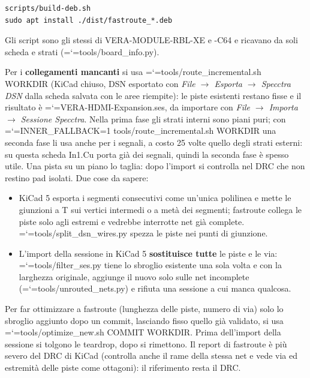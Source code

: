 \documentclass[11pt,a4paper]{article}
\makeatletter
\newcommand{\file}[1]{{\ttfamily\hyphenchar\font=`\-\relax\language=\l@nohyphenation #1}}
\makeatother
\begin{document}
\begin{lstlisting}[style=shell]
scripts/build-deb.sh
sudo apt install ./dist/fastroute_*.deb
\end{lstlisting}

Gli script sono gli stessi di VERA-MODULE-RBL-XE e -C64 e ricavano da soli
scheda e strati (\file{tools/board\_info.py}).

Per i \textbf{collegamenti mancanti} si usa
\file{tools/route\_incremental.sh WORKDIR} (KiCad chiuso, DSN esportato con
\emph{File $\rightarrow$ Esporta $\rightarrow$ Specctra DSN} dalla scheda
salvata con le aree riempite): le piste esistenti restano fisse e il risultato
è \file{VERA-HDMI-Expansion.ses}, da importare con \emph{File $\rightarrow$
Importa $\rightarrow$ Sessione Specctra}. Nella prima fase gli strati interni
sono piani puri; con \file{INNER\_FALLBACK=1 tools/route\_incremental.sh
WORKDIR} una seconda fase li usa anche per i segnali, a costo 25 volte quello
degli strati esterni: su questa scheda In1.Cu porta già dei segnali, quindi la
seconda fase è spesso utile. Una pista su un piano lo taglia: dopo l'import si
controlla nel DRC che non restino pad isolati. Due cose da sapere:

\begin{itemize}[leftmargin=*]
  \item KiCad 5 esporta i segmenti consecutivi come un'unica polilinea e mette
    le giunzioni a T sui vertici intermedi o a metà dei segmenti; fastroute
    collega le piste solo agli estremi e vedrebbe interrotte net già complete.
    \file{tools/split\_dsn\_wires.py} spezza le piste nei punti di giunzione.
  \item L'import della sessione in KiCad 5 \textbf{sostituisce tutte} le piste e
    le via: \file{tools/filter\_ses.py} tiene lo sbroglio esistente una sola
    volta e con la larghezza originale, aggiunge il nuovo solo sulle net
    incomplete (\file{tools/unrouted\_nets.py}) e rifiuta una sessione a cui
    manca qualcosa.
\end{itemize}

Per far ottimizzare a fastroute (lunghezza delle piste, numero di via) solo lo
sbroglio aggiunto dopo un commit, lasciando fisso quello già validato, si usa
\file{tools/optimize\_new.sh COMMIT WORKDIR}. Prima dell'import della sessione
si tolgono le teardrop, dopo si rimettono. Il report di fastroute è più severo
del DRC di KiCad (controlla anche il rame della stessa net e vede via ed
estremità delle piste come ottagoni): il riferimento resta il DRC.
\end{document}
